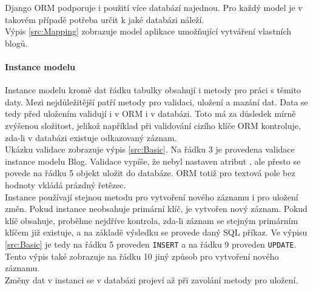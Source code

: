 \documentclass[ing,male,java,dept456]{diploma}						%
\begin{document}
Django ORM podporuje i použití více databází najednou. Pro každý model je v takovém případě potřeba určit k jaké databázi náleží. \\
Výpis \ref{src:Mapping} zobrazuje model aplikace umožňující vytváření vlastních blogů. 

\paragraph{Instance modelu}

Instance modelu kromě dat řádku tabulky obsahují i metody pro práci s těmito daty. Mezi nejdůležitější patří metody pro validaci, uložení a mazání dat. Data se tedy před uložením validují i v ORM i v databázi. Toto má za důsledek mírně zvýšenou složitost, jelikož například při validování cizího klíče ORM kontroluje, zda-li v databázi existuje odkazovaný záznam. \\
Ukázku validace zobrazuje výpis \ref{src:Basic}. Na řádku 3 je provedena validace instance modelu Blog. Validace vypíše, že nebyl nastaven atribut , ale přesto se povede na řádku 5 objekt uložit do databáze. ORM totiž pro textová pole bez hodnoty vkládá prázdný řetězec. \\
Instance používají stejnou metodu pro vytvoření nového záznamu i pro uložení změn. Pokud instance neobsahuje primární klíč, je vytvořen nový záznam. Pokud klíč obsahuje, proběhne nejdříve kontrola, zda-li záznam se stejným primárním klíčem již existuje, a na základě výsledku se provede daný SQL příkaz. Ve výpisu \ref{src:Basic} je tedy na řádku 5 proveden \lstinline[style=customsql]|INSERT| a na řádku 9 proveden \lstinline[style=customsql]|UPDATE|. Tento výpis také zobrazuje na řádku 10 jiný způsob pro vytvoření nového záznamu.\\
Změny dat v instanci se v databázi projeví až při zavolání metody pro uložení. 
\end{document}
